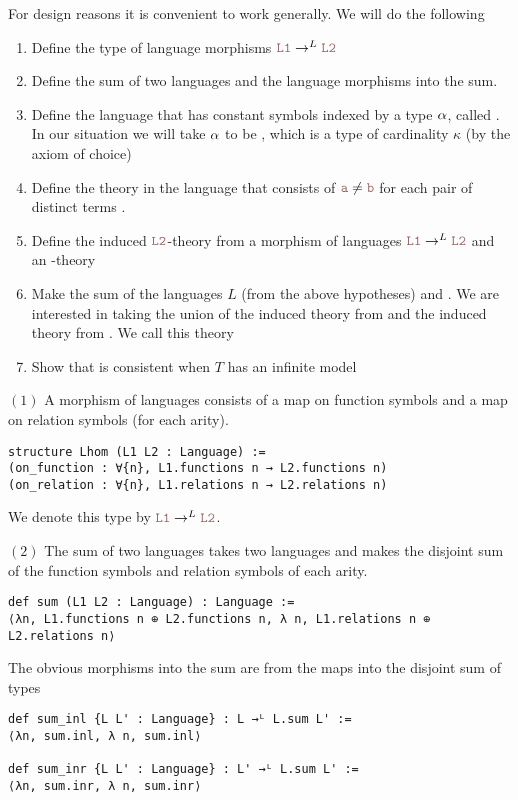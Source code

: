 For design reasons it is convenient to work generally.
We will do the following
\begin{enumerate}
  \item Define the type of language morphisms $\code{L1} \to^{L} \code{L2}$
  \item Define the sum of two languages 
        and the language morphisms into the sum.
  \item Define the language that has constant symbols indexed by a type $\alpha$,
        called .
        In our situation we will take $\alpha$ to be ,
        which is a type of cardinality $\kappa$ (by the axiom of choice)
  \item Define the theory 
        in the language 
        that consists of $\code{a} \ne \code{b}$
        for each pair of distinct terms .
  \item Define the induced $\code{L2}$-theory
        from a morphism of languages $\code{L1} \to^{L} \code{L2}$ and
        an -theory
  \item Make the sum of the languages $L$ (from the above hypotheses)
        and .
        We are interested in taking the union of the induced theory from 
        and the induced theory from
        .
        We call this theory 
  \item Show that  is consistent
        when $T$ has an infinite model
\end{enumerate}

$(1)$ A morphism of languages consists of a map on function symbols
and a map on relation symbols (for each arity).
\begin{lstlisting}
structure Lhom (L1 L2 : Language) :=
(on_function : ∀{n}, L1.functions n → L2.functions n)
(on_relation : ∀{n}, L1.relations n → L2.relations n) \end{lstlisting}
We denote this type by $\code{L1} \to^{L} \code{L2}$.

$(2)$ The sum of two languages takes two languages and makes the
disjoint sum of the function symbols and relation symbols of
each arity.
\begin{lstlisting}
def sum (L1 L2 : Language) : Language :=
⟨λn, L1.functions n ⊕ L2.functions n, λ n, L1.relations n ⊕ L2.relations n⟩ \end{lstlisting}
The obvious morphisms into the sum are from the maps into the disjoint
sum of types
\begin{lstlisting}
def sum_inl {L L' : Language} : L →ᴸ L.sum L' :=
⟨λn, sum.inl, λ n, sum.inl⟩

def sum_inr {L L' : Language} : L' →ᴸ L.sum L' :=
⟨λn, sum.inr, λ n, sum.inr⟩ \end{lstlisting}

